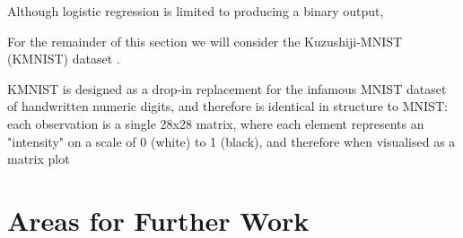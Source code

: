 \documentclass{article}[11pt]
\begin{document}
        Although logistic regression is limited to producing a binary output, 
        
        
        
        For the remainder of this section we will consider the Kuzushiji-MNIST (KMNIST) dataset \cite{kmnist}. 
        
        KMNIST is designed as a drop-in replacement for the infamous MNIST dataset of handwritten numeric digits, and therefore is identical in structure to MNIST: each observation is a single 28x28 matrix, where each element represents an "intensity" on a scale of 0 (white) to 1 (black), and therefore when visualised as a matrix plot



\section{Areas for Further Work}





\end{document}
